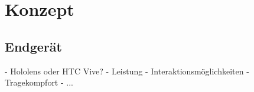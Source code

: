 
\chapter{Konzept}

\section{Endgerät}

- Hololens oder HTC Vive?
- Leistung
- Interaktionsmöglichkeiten
- Tragekompfort
- ...